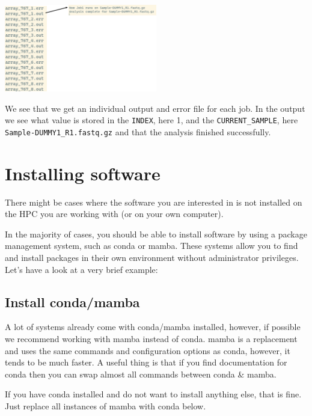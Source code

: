\documentclass[
  letterpaper,
  DIV=11,
  numbers=noendperiod]{scrreprt}
\begin{document}
\begin{tcolorbox}
\begin{center}
\includegraphics[width=0.5\textwidth,height=\textheight]{../img/arrays2.png}
\end{center}

We see that we get an individual output and error file for each job. In
the output we see what value is stored in the \texttt{INDEX}, here 1,
and the \texttt{CURRENT\_SAMPLE}, here
\texttt{Sample-DUMMY1\_R1.fastq.gz} and that the analysis finished
successfully.

\end{tcolorbox}

\section{Installing software}\label{installing-software}

There might be cases where the software you are interested in is not
installed on the HPC you are working with (or on your own computer).

In the majority of cases, you should be able to install software by
using a package management system, such as conda or mamba. These systems
allow you to find and install packages in their own environment without
administrator privileges. Let's have a look at a very brief example:

\subsection{Install conda/mamba}\label{install-condamamba}

A lot of systems already come with conda/mamba installed, however, if
possible we recommend working with mamba instead of conda. mamba is a
replacement and uses the same commands and configuration options as
conda, however, it tends to be much faster. A useful thing is that if
you find documentation for conda then you can swap almost all commands
between conda \& mamba.

If you have conda installed and do not want to install anything else,
that is fine. Just replace all instances of mamba with conda below.
\end{document}
